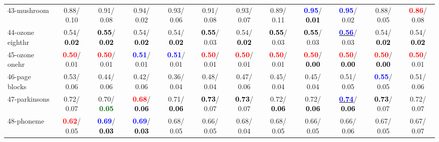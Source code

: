 \begin{table}[h]
\begin{center}
{\begin{tabular}{lc|c|c|c|c|c|c|c|c|c|c}
43-mushroom &   0.88/  0.10 &   0.91/  0.08 &   0.94/  0.02 &   0.93/  0.06 &   0.91/  0.08 &   0.93/  0.07 &   0.89/  0.11 & \textcolor{blue}{\textbf{  0.95}}/\textcolor{black}{\textbf{  0.01}} & \textcolor{blue}{\textbf{  0.95}}/  0.02 &   0.88/  0.05 & \textcolor{red}{\textbf{  0.86}}/  0.08 \\
44-ozone eighthr &   0.54/\textcolor{black}{\textbf{  0.02}} & \textcolor{black}{\textbf{  0.55}}/\textcolor{black}{\textbf{  0.02}} &   0.54/\textcolor{black}{\textbf{  0.02}} &   0.54/\textcolor{black}{\textbf{  0.02}} & \textcolor{black}{\textbf{  0.55}}/  0.03 &   0.54/\textcolor{black}{\textbf{  0.02}} & \textcolor{black}{\textbf{  0.55}}/  0.03 & \textcolor{black}{\textbf{  0.55}}/  0.03 & \underline{\textcolor{blue}{\textbf{  0.56}}}/  0.03 &   0.54/\textcolor{black}{\textbf{  0.02}} &   0.54/\textcolor{black}{\textbf{  0.02}} \\
45-ozone onehr & \textcolor{red}{\textbf{  0.50}}/  0.01 & \textcolor{red}{\textbf{  0.50}}/  0.01 & \textcolor{blue}{\textbf{  0.51}}/  0.01 & \textcolor{blue}{\textbf{  0.51}}/  0.01 & \textcolor{red}{\textbf{  0.50}}/  0.01 & \textcolor{red}{\textbf{  0.50}}/  0.01 & \textcolor{red}{\textbf{  0.50}}/  0.01 & \textcolor{red}{\textbf{  0.50}}/\textcolor{black}{\textbf{  0.00}} & \textcolor{red}{\textbf{  0.50}}/\textcolor{black}{\textbf{  0.00}} & \textcolor{red}{\textbf{  0.50}}/\textcolor{black}{\textbf{  0.00}} & \textcolor{red}{\textbf{  0.50}}/  0.01 \\
46-page blocks &   0.53/  0.06 &   0.44/  0.06 &   0.42/  0.06 &   0.36/  0.04 &   0.48/  0.04 &   0.47/  0.06 &   0.45/  0.04 &   0.45/  0.04 &   0.51/  0.05 & \textcolor{blue}{\textbf{  0.55}}/  0.05 &   0.51/  0.06 \\ \hline
47-parkinsons &   0.72/  0.07 &   0.70/\textcolor{darkgreen}{\textbf{  0.05}} & \textcolor{red}{\textbf{  0.68}}/\textcolor{black}{\textbf{  0.06}} &   0.71/\textcolor{black}{\textbf{  0.06}} & \textcolor{black}{\textbf{  0.73}}/  0.07 & \textcolor{black}{\textbf{  0.73}}/  0.07 &   0.72/\textcolor{black}{\textbf{  0.06}} &   0.72/\textcolor{black}{\textbf{  0.06}} & \underline{\textcolor{blue}{\textbf{  0.74}}}/\textcolor{black}{\textbf{  0.06}} & \textcolor{black}{\textbf{  0.73}}/  0.07 &   0.72/  0.07 \\
48-phoneme & \textcolor{red}{\textbf{  0.62}}/  0.05 & \textcolor{blue}{\textbf{  0.69}}/\textcolor{black}{\textbf{  0.03}} & \textcolor{blue}{\textbf{  0.69}}/\textcolor{black}{\textbf{  0.03}} &   0.68/  0.05 &   0.66/  0.05 &   0.68/  0.04 &   0.68/  0.05 &   0.66/  0.05 &   0.66/  0.06 &   0.67/  0.05 &   0.67/  0.07 \\

\end{tabular}}
\end{center}
\end{table}
